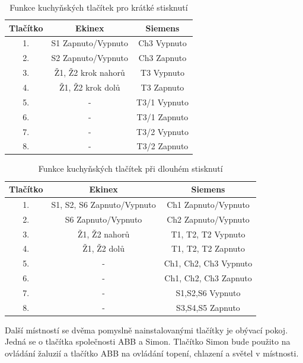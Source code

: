 \begin{table}[h]
 \caption[Funkce kuchyňských tlačítek pro krátké stisknutí]{Funkce kuchyňských tlačítek pro krátké stisknutí}
   \small
    \centering
	  \begin{tabular}{|c|c|c|}
	    \hline
	    Tlačítko & Ekinex & Siemens  \\
	    \hline\hline
	    1. & S1 Zapnuto/Vypnuto & Ch3 Vypnuto \\
	    \hline
        2. & S2 Zapnuto/Vypnuto & Ch3 Zapnuto \\
	    \hline
        3. & Ž1, Ž2 krok nahorů & T3 Vypnuto \\
	    \hline
        4. & Ž1, Ž2 krok dolů & T3 Zapnuto \\
	    \hline
        5. & - & T3/1 Vypnuto \\
	    \hline 
        6. & - & T3/1 Zapnuto \\
	    \hline 
	    7. & - & T3/2 Vypnuto \\
	    \hline
	    8. & - & T3/2 Zapnuto \\
	    \hline
	  \end{tabular}
\end{table}

\begin{table}[h]
 \caption[Funkce kuchyňských tlačítek při dlouhém stisknutí]{Funkce kuchyňských tlačítek při dlouhém stisknutí}
   \small
    \centering
	  \begin{tabular}{|c|c|c|}
	    \hline
	    Tlačítko & Ekinex & Siemens  \\
	    \hline\hline
	    1. & S1, S2, S6 Zapnuto/Vypnuto &  Ch1 Zapnuto/Vypnuto \\
	    \hline
        2. & S6 Zapnuto/Vypnuto &  Ch2 Zapnuto/Vypnuto \\
	    \hline
        3. &  Ž1, Ž2 nahorů & T1, T2, T2 Vypnuto \\
	    \hline
        4. & Ž1, Ž2 dolů & T1, T2, T2 Zapnuto \\
	    \hline
        5. & - &  Ch1, Ch2, Ch3 Vypnuto\\
	    \hline 
        6. & - & Ch1, Ch2, Ch3 Zapnuto \\
	    \hline 
	    7. & - & S1,S2,S6 Vypnuto \\
	    \hline
	    8. & - & S3,S4,S5 Zapnuto \\
	    \hline
	  \end{tabular}
\end{table}

\newpage Další místností se dvěma pomyslně nainstalovanými tlačítky je obývací pokoj. Jedná se o tlačítka společnosti ABB a Simon. Tlačítko Simon bude použito na ovládání žaluzií a tlačítko ABB na ovládání topení, chlazení a světel v místnosti.

